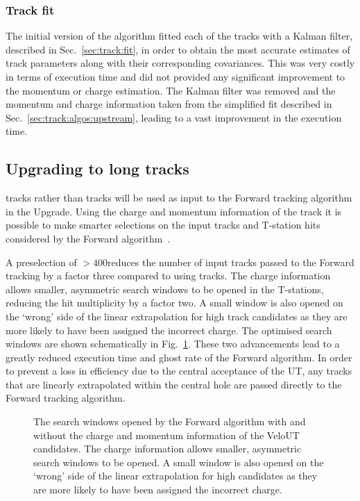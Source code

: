 \subsubsection{Track fit}

The initial version of the \velout algorithm fitted each of the \velout tracks with a Kalman filter, described in Sec.~\ref{sec:track:fit}, in order to obtain the most accurate estimates of track parameters along with their corresponding covariances. This was very costly in terms of execution time and did not provided any significant improvement to the momentum or charge estimation. The Kalman filter was removed and the momentum and charge information taken from the simplified fit described in Sec.~\ref{sec:track:algos:upstream}, leading to a vast improvement in the execution time.

\subsection{Upgrading to long tracks}

\velout tracks rather than \velo tracks will be used as input to the Forward tracking algorithm in the \lhcb Upgrade. Using the charge and momentum information of the \velout track it is possible to make smarter selections on the input tracks and T-station hits considered by the Forward algorithm~\cite{LHCb-TDR-015,velout}. 

A preselection of \pt $>400$\mevc reduces the number of input tracks passed to the Forward tracking by a factor three compared to using \velo tracks. The charge information allows smaller, asymmetric search windows to be opened in the T-stations, reducing the hit multiplicity by a factor two. A small window is also opened on the `wrong' side of the linear extrapolation for high \pt track candidates as they are more likely to have been assigned the incorrect charge. The optimised search windows are shown schematically in Fig.~\ref{fig:searchwindow}. These two advancements lead to a greatly reduced execution time and ghost rate of the Forward algorithm. In order to prevent a loss in efficiency due to the central acceptance of the UT, any \velo tracks that are linearly extrapolated within the central hole are passed directly to the Forward tracking algorithm.

\begin{figure}[!tb]

\caption{The search windows opened by the Forward algorithm with and without the charge and momentum information of the VeloUT candidates. The charge information allows smaller, asymmetric search windows to be opened. A small window is also opened on the `wrong' side of the linear extrapolation for high \pt candidates as they are more likely to have been assigned the incorrect charge.}
\label{fig:searchwindow}
\end{figure}

